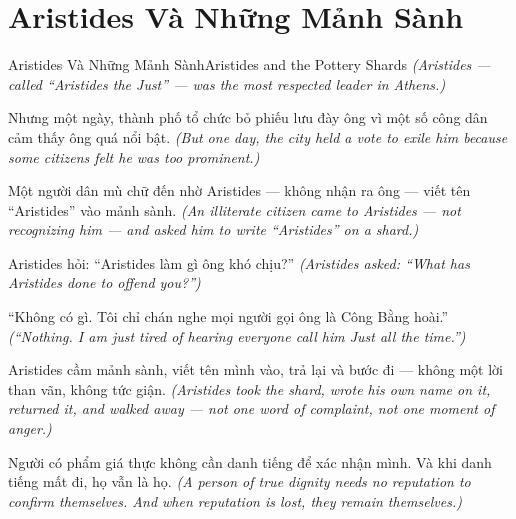 \section{Aristides Và Những Mảnh Sành}
\begin{truyen}{Aristides Và Những Mảnh Sành}{Aristides and the Pottery Shards}
\textit{(Aristides — called ``Aristides the Just'' — was the most respected leader in Athens.)}

Nhưng một ngày, thành phố tổ chức bỏ phiếu lưu đày ông vì một số công dân cảm thấy ông quá nổi bật.
\textit{(But one day, the city held a vote to exile him because some citizens felt he was too prominent.)}

Một người dân mù chữ đến nhờ Aristides — không nhận ra ông — viết tên ``Aristides'' vào mảnh sành.
\textit{(An illiterate citizen came to Aristides — not recognizing him — and asked him to write ``Aristides'' on a shard.)}

Aristides hỏi: ``Aristides làm gì ông khó chịu?''
\textit{(Aristides asked: ``What has Aristides done to offend you?'')}

``Không có gì. Tôi chỉ chán nghe mọi người gọi ông là Công Bằng hoài.''
\textit{(``Nothing. I am just tired of hearing everyone call him Just all the time.'')}

Aristides cầm mảnh sành, viết tên mình vào, trả lại và bước đi — không một lời than vãn, không tức giận.
\textit{(Aristides took the shard, wrote his own name on it, returned it, and walked away — not one word of complaint, not one moment of anger.)}

\end{truyen}

\begin{baihoc}
Người có phẩm giá thực không cần danh tiếng để xác nhận mình. Và khi danh tiếng mất đi, họ vẫn là họ.
\textit{(A person of true dignity needs no reputation to confirm themselves. And when reputation is lost, they remain themselves.)}
\end{baihoc}
\ngancach

